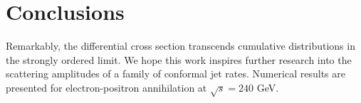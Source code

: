 \section{Conclusions}\label{sec:conclusions}

Remarkably, the differential cross section transcends cumulative
distributions in the strongly ordered limit. We hope this work inspires
further research into the scattering amplitudes of a family of conformal
jet rates. Numerical results are presented for electron-positron
annihilation at $\sqrt{s} = 240$ GeV.

